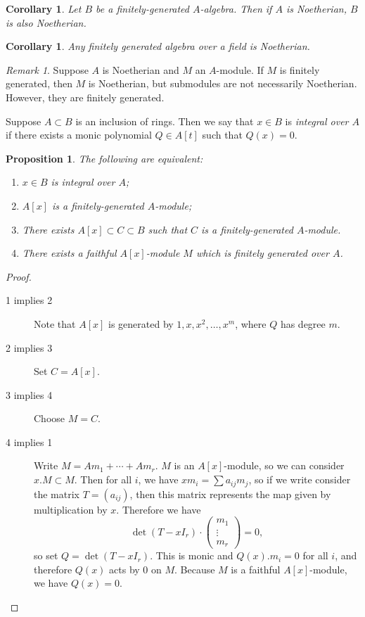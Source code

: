 \documentclass[leqno, openany]{memoir}
\newtheorem{cor}[thm]{Corollary}
\newtheorem{prop}[thm]{Proposition}
\theoremstyle{definition}
\theoremstyle{remark}
\newtheorem{rmk}[thm]{Remark}
\theoremstyle{plain}
\theoremstyle{definition}
\theoremstyle{remark}
\begin{document}
\begin{cor} Let $B$ be a finitely-generated $A$-algebra. Then if $A$ is
Noetherian, $B$ is also Noetherian.  \end{cor}

\begin{cor} Any finitely generated algebra over a field is Noetherian.
\end{cor}

\begin{rmk} Suppose $A$ is Noetherian and $M$ an $A$-module. If $M$ is finitely
generated, then $M$ is Noetherian, but submodules are not necessarily
Noetherian. However, they are finitely generated.  \end{rmk}

Suppose $A \subset B$ is an inclusion of rings. Then we say that $x \in B$ is
\textit{integral over $A$} if there exists a monic polynomial $Q \in A[t]$ such
that $Q(x) = 0$.

\begin{prop} \label{prop:integral} The following are equivalent:
    \begin{enumerate} \item $x \in B$ is integral over $A$; \item $A[x]$ is a
        finitely-generated $A$-module; \item There exists $A[x] \subset C
        \subset B$ such that $C$ is a finitely-generated $A$-module.  \item
There exists a faithful $A[x]$-module $M$ which is finitely generated over $A$.
\end{enumerate} \end{prop}

\begin{proof} \begin{description} \item[1 implies 2] Note that $A[x]$ is
    generated by $1,x,x^2, \ldots, x^m$, where $Q$ has degree $m$.  \item[2
    implies 3] Set $C = A[x]$.  \item[3 implies 4] Choose $M = C$.  \item[4
    implies 1] Write $M = Am_1 + \cdots + A m_r$. $M$ is an $A[x]$-module, so
    we can consider $x . M \subset M$. Then for all $i$, we have $x m_i = \sum
    a_{ij} m_j$, so if we write consider the matrix $T = (a_{ij})$, then this
    matrix represents the map given by multiplication by $x$. Therefore we have
    \[ \det (T - x I_r) \cdot \begin{pmatrix} m_1 \\ \vdots \\ m_r
    \end{pmatrix} = 0, \] so set $Q = \det(T - x I_r)$. This is monic and $Q(x)
    . m_i = 0$ for all $i$, and therefore $Q(x)$ acts by $0$ on $M$. Because
    $M$ is a faithful $A[x]$-module, we have $Q(x) = 0$.  \end{description}
\end{proof}
\end{document}
